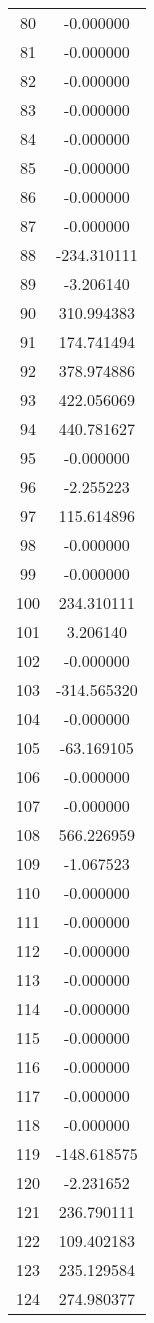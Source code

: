 \documentclass[12pt]{article}
\begin{document}
\begin{longtable}{@{}cc@{}}
80 & -0.000000 \\
81 & -0.000000 \\
82 & -0.000000 \\
83 & -0.000000 \\
84 & -0.000000 \\
85 & -0.000000 \\
86 & -0.000000 \\
87 & -0.000000 \\
88 & -234.310111 \\
89 & -3.206140 \\
90 & 310.994383 \\
91 & 174.741494 \\
92 & 378.974886 \\
93 & 422.056069 \\
94 & 440.781627 \\
95 & -0.000000 \\
96 & -2.255223 \\
97 & 115.614896 \\
98 & -0.000000 \\
99 & -0.000000 \\
100 & 234.310111 \\
101 & 3.206140 \\
102 & -0.000000 \\
103 & -314.565320 \\
104 & -0.000000 \\
105 & -63.169105 \\
106 & -0.000000 \\
107 & -0.000000 \\
108 & 566.226959 \\
109 & -1.067523 \\
110 & -0.000000 \\
111 & -0.000000 \\
112 & -0.000000 \\
113 & -0.000000 \\
114 & -0.000000 \\
115 & -0.000000 \\
116 & -0.000000 \\
117 & -0.000000 \\
118 & -0.000000 \\
119 & -148.618575 \\
120 & -2.231652 \\
121 & 236.790111 \\
122 & 109.402183 \\
123 & 235.129584 \\
124 & 274.980377 \\

\end{longtable}
\end{document}
